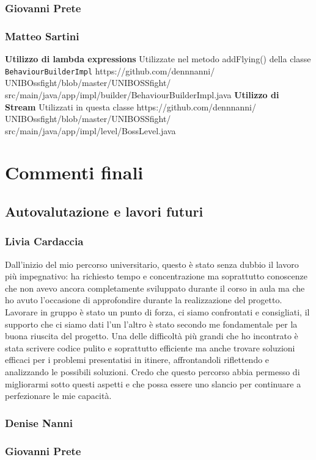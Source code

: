 \documentclass{article}
\begin{document}
\subsubsection{Giovanni Prete}
\subsubsection{Matteo Sartini}
\textbf{Utilizzo di lambda expressions}
\newline
Utilizzate nel metodo addFlying() della classe \texttt{BehaviourBuilderImpl} https://github.com/dennnanni/
UNIBOssfight/blob/master/UNIBOSSfight/
src/main/java/app/impl/builder/BehaviourBuilderImpl.java
\textbf{Utilizzo di Stream}
\newline
Utilizzati in questa classe https://github.com/dennnanni/
UNIBOssfight/blob/master/UNIBOSSfight/
src/main/java/app/impl/level/BossLevel.java
\large
\section{Commenti finali}
\subsection{Autovalutazione e lavori futuri}
\subsubsection{Livia Cardaccia}
Dall'inizio del mio percorso universitario, questo è stato senza dubbio il lavoro più impegnativo: ha richiesto tempo e concentrazione ma soprattutto conoscenze che non avevo ancora completamente sviluppato durante il corso in aula ma che ho avuto l'occasione di approfondire durante la realizzazione del progetto. Lavorare in gruppo è stato un punto di forza, ci siamo confrontati e consigliati, il supporto che ci siamo dati l'un l'altro è stato secondo me fondamentale per la buona riuscita del progetto. Una delle difficoltà più grandi che ho incontrato è stata scrivere codice pulito e soprattutto efficiente ma anche trovare soluzioni efficaci per i problemi presentatisi in itinere, affrontandoli riflettendo e analizzando le possibili soluzioni. Credo che questo percorso abbia permesso di migliorarmi sotto questi aspetti e che possa essere uno slancio per continuare a perfezionare le mie capacità. 
\subsubsection{Denise Nanni}
\subsubsection{Giovanni Prete}
\end{document}
